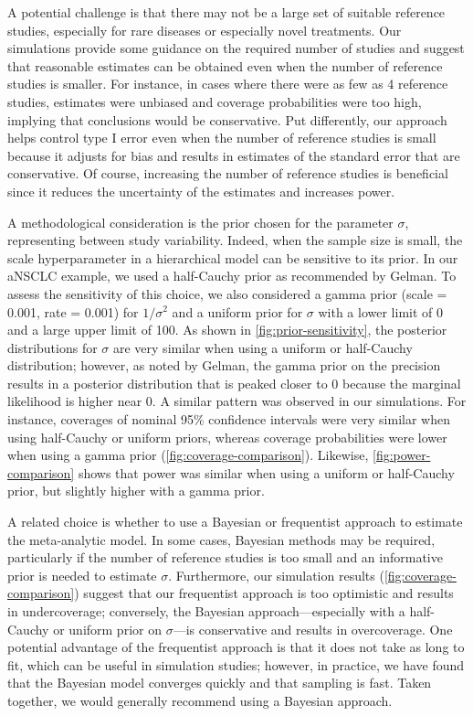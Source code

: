 \documentclass[11pt,final,fleqn]{article}\usepackage[]{graphicx}\usepackage[]{color}
\begin{document}
A potential challenge is that there may not be a large set of suitable reference studies, especially for rare diseases or especially novel treatments. Our simulations provide some guidance on the required number of studies and suggest that reasonable estimates can be obtained even when the number of reference studies is smaller. For instance, in cases where there were as few as 4 reference studies, estimates were unbiased and coverage probabilities were too high, implying that conclusions would be conservative. Put differently, our approach helps control type I error even when the number of reference studies is small because it adjusts for bias and results in estimates of the standard error that are conservative. Of course, increasing the number of reference studies is beneficial since it reduces the uncertainty of the estimates and increases power. 

A methodological consideration is the prior chosen for the parameter $\sigma$, representing between study variability. Indeed, when the sample size is small, the scale hyperparameter in a hierarchical model can be sensitive to its prior. In our aNSCLC example, we used a half-Cauchy prior as recommended by Gelman.\cite{gelman2006prior} To assess the sensitivity of this choice, we also considered a gamma prior (scale = 0.001, rate = 0.001) for $1/\sigma^2$ and a uniform prior for $\sigma$ with a lower limit of 0 and a large upper limit of 100. As shown in \autoref{fig:prior-sensitivity}, the posterior distributions for $\sigma$ are very similar when using a uniform or half-Cauchy distribution; however, as noted by Gelman, the gamma prior on the precision results in a posterior distribution that is peaked closer to 0 because the marginal likelihood is higher near 0. A similar pattern was observed in our simulations. For instance, coverages of nominal 95\% confidence intervals were very similar when using half-Cauchy or uniform priors, whereas coverage probabilities were lower when using a gamma prior (\autoref{fig:coverage-comparison}). Likewise, \autoref{fig:power-comparison} shows that power was similar when using a uniform or half-Cauchy prior, but slightly higher with a gamma prior.

A related choice is whether to use a Bayesian or frequentist approach to estimate the meta-analytic model. In some cases, Bayesian methods may be required, particularly if the number of reference studies is too small and an informative prior is needed to estimate $\sigma$. Furthermore, our simulation results (\autoref{fig:coverage-comparison}) suggest that our frequentist approach is too optimistic and results in undercoverage; conversely, the Bayesian approach---especially with a half-Cauchy or uniform prior on $\sigma$---is conservative and results in overcoverage. One potential advantage of the frequentist approach is that it does not take as long to fit, which can be useful in simulation studies; however, in practice, we have found that the Bayesian model converges quickly and that sampling is fast. Taken together, we would generally recommend using a Bayesian approach.
\end{document}
